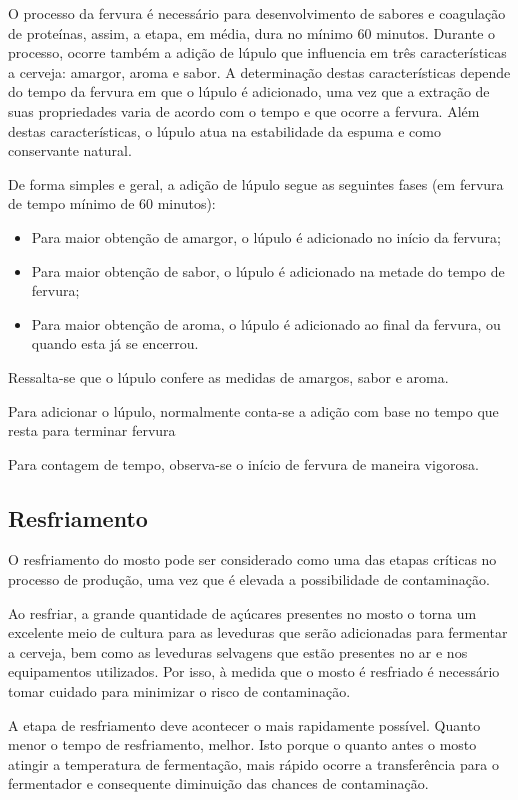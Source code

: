 O processo da fervura é necessário para desenvolvimento de sabores e coagulação de proteínas, assim, a etapa, em média, dura no mínimo 60 minutos. Durante o processo, ocorre também a adição de lúpulo que influencia em três características a cerveja: amargor, aroma e sabor. A determinação destas características depende do tempo da fervura em que o lúpulo é adicionado, uma vez que a extração de suas propriedades varia de acordo com o tempo e que ocorre a fervura. Além destas características, o lúpulo atua na estabilidade da espuma e como conservante natural.

De forma simples e geral, a adição de lúpulo segue as seguintes fases (em fervura de tempo mínimo de 60 minutos):

\begin{itemize}
    \item Para maior obtenção de amargor, o lúpulo é adicionado no início da fervura;
    \item Para maior obtenção de sabor, o lúpulo é adicionado na metade do tempo de fervura;
    \item Para maior obtenção de aroma, o lúpulo é adicionado ao final da fervura, ou quando esta já se encerrou.
\end{itemize}

Ressalta-se que o lúpulo confere as medidas de amargos, sabor e aroma.

Para adicionar o lúpulo, normalmente conta-se a adição com base no tempo que resta para terminar fervura

Para contagem de tempo, observa-se o início de fervura de maneira vigorosa.

\subsection{Resfriamento}

O resfriamento do mosto pode ser considerado como uma das etapas críticas no processo de produção, uma vez que é elevada a possibilidade de contaminação.

Ao resfriar, a grande quantidade de açúcares presentes no mosto o torna um excelente meio de cultura para as leveduras que serão adicionadas para fermentar a cerveja, bem como as leveduras selvagens que estão presentes no ar e nos equipamentos utilizados. Por isso, à medida que o mosto é resfriado é necessário tomar cuidado para minimizar o risco de contaminação.

A etapa de resfriamento deve acontecer o mais rapidamente possível. Quanto menor o tempo de resfriamento, melhor. Isto porque o quanto antes o mosto atingir a temperatura de fermentação, mais rápido ocorre a transferência para o fermentador e consequente diminuição das chances de contaminação.

